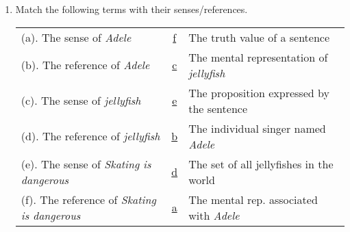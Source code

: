 \documentclass[letterpaper,12pt]{article}
\begin{document}
\begin{enumerate}
\item Match the following terms with their senses/references.
    \begin{table}[htpb]
        \begin{tabular}{l c l}
            (a). The sense of \textit{Adele} & \underline{f} & The truth value of a sentence\\
            (b). The reference of \textit{Adele} & \underline{c} & The mental representation of \textit{jellyfish}\\
            (c). The sense of \textit{jellyfish} & \underline{e} & The proposition expressed by the sentence\\
            (d). The reference of \textit{jellyfish} & \underline{b} & The individual singer named \textit{Adele}\\
            (e). The sense of \textit{Skating is dangerous} & \underline{d} & The set of all jellyfishes in the world\\
            (f). The reference of \textit{Skating is dangerous} & \underline{a} & The mental rep. associated with \textit{Adele}\\
        \end{tabular}
    \end{table}

\end{enumerate}
\end{document}
